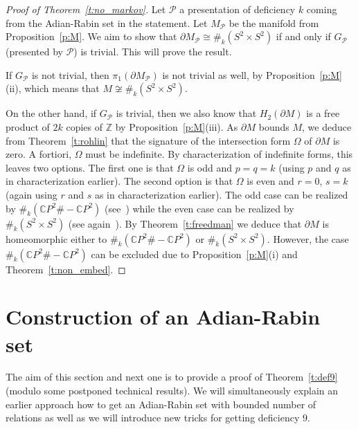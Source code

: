\documentclass[10pt,a4paper]{article}
\theoremstyle{definition}
\theoremstyle{remark}
\newcommand{\CP}{{\mathbb{C}P}}
\newcommand{\Z}{{\mathbb{Z}}}
\newcommand\PP{\mathcal{P}}
\begin{document}
\begin{proof}[Proof of Theorem~\ref{t:no_markov}]
  Let $\PP$ a presentation of deficiency $k$ coming from the Adian-Rabin set in
  the statement. Let $M_{\PP}$ be the manifold from Proposition~\ref{p:M}. We aim to
  show that $\partial M_{\PP} \cong \#_k(S^2 \times S^2)$ if and only if
  $G_{\PP}$
  (presented by $\PP$) is trivial. This will prove the result.

  If $G_{\PP}$ is not trivial, then $\pi_1(\partial M_{\PP})$ is not trivial as well, by
  Proposition~\ref{p:M}(ii), which means that $M \not\cong \#_k(S^2 \times S^2)$.

  On the other hand, if $G_{\PP}$ is trivial, then we also 
  know that $H_2(\partial M)$ is a free product of $2k$ copies of
  $\Z$ by Proposition~\ref{p:M}(iii). 
  As $\partial M$ bounds $M$, we deduce from Theorem~\ref{t:rohlin} that the
  signature of the intersection form $\Omega$ of $\partial M$ is zero. A
  fortiori, $\Omega$ must be indefinite. By characterization of indefinite
  forms, this leaves two options. The first one is that $\Omega$ is odd and
  $p=q = k$ (using $p$ and $q$ as in characterization earlier). The second
  option is that $\Omega$ is even and $r=0$, $s = k$ (again using $r$ and $s$
  as in characterization earlier). The odd case can be realized by $\#_k(\CP^2
  \# -\CP^2)$ (see~\cite{kirby89}) while the even case can be realized by $\#_k(S^2
  \times S^2)$ (see again~\cite{kirby89}). By Theorem~\ref{t:freedman} we deduce
  that $\partial M$ is homeomorphic either to $\#_k(\CP^2
  \# -\CP^2)$ or $\#_k(S^2 \times S^2)$. However, the case $\#_k(\CP^2
  \# -\CP^2)$ can be excluded due to Proposition~\ref{p:M}(i) and
  Theorem~\ref{t:non_embed}.
\end{proof}


\section{Construction of an Adian-Rabin set}
\label{s:ar_sequence}

The aim of this section and next one is to provide a proof of
Theorem~\ref{t:def9} (modulo some postponed technical results). We will
simultaneously explain an earlier approach how to get an Adian-Rabin set with
bounded number of relations as well as we will introduce new tricks for getting
deficiency $9$. 
\end{document}
